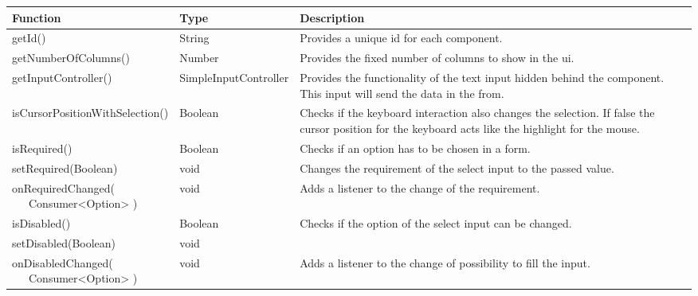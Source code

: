 \begin{table}[!htb] 
    \label{api:selectControllerReturn}
    \footnotesize
    \setlength\extrarowheight{4pt}
    \begin{tabular}{ p{5cm} p{3cm} p{5cm} }
        \toprule[1.2pt]
        \textbf{Function}                    & \textbf{Type}          & \textbf{Description} \\
        \midrule
        getId()                              & String                 & Provides a unique id for each component. \\
        getNumberOfColumns()                 & Number                 & Provides the fixed number of columns to show in the ui. \\
        getInputController()                 & SimpleInputController  & Provides the functionality of the text input hidden behind the component. 
                                                                        This input will send the data in the from. \\
        isCursorPositionWithSelection()      & Boolean                & Checks if the keyboard interaction also changes the selection. 
                                                                        If false the cursor position for the keyboard acts like the highlight for the mouse. \\
        isRequired()                         & Boolean                & Checks if an option has to be chosen in a form. \\
        setRequired(Boolean)                 & void                   & Changes the requirement of the select input to the passed value. \\
        \tbbr{
            onRequiredChanged( \\
                \ \ \ Consumer<Option>
            )}                               & void                   & Adds a listener to the change of the requirement. \\
        isDisabled()                         & Boolean                & Checks if the option of the select input can be changed.  \\
        setDisabled(Boolean)                 & void                   &  \\
        \tbbr{
            onDisabledChanged( \\
                \ \ \ Consumer<Option>
            )}                               & void                   & Adds a listener to the change of possibility to fill the input. \\

\end{tabular}
\end{table}
